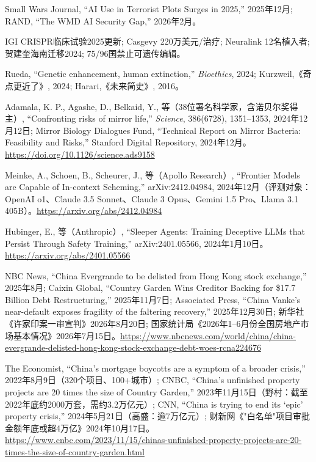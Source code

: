 \documentclass[11pt,a4paper]{ctexart}
\begin{document}
\noindent [112] Small Wars Journal, ``AI Use in Terrorist Plots Surges in 2025,'' 2025年12月; RAND, ``The WMD AI Security Gap,'' 2026年2月。

\noindent [113] IGI CRISPR临床试验2025更新; Casgevy 220万美元/治疗; Neuralink 12名植入者; 贺建奎海南迁移2024; 75/96国禁止可遗传编辑。

\noindent [114] Rueda, ``Genetic enhancement, human extinction,'' \emph{Bioethics}, 2024; Kurzweil,《奇点更近了》, 2024; Harari,《未来简史》, 2016。

\noindent [115] Adamala, K. P., Agashe, D., Belkaid, Y., 等（38位署名科学家，含诺贝尔奖得主）, ``Confronting risks of mirror life,'' \emph{Science}, 386(6728), 1351--1353, 2024年12月12日; Mirror Biology Dialogues Fund, ``Technical Report on Mirror Bacteria: Feasibility and Risks,'' Stanford Digital Repository, 2024年12月。\url{https://doi.org/10.1126/science.ads9158}

\noindent [116] Meinke, A., Schoen, B., Scheurer, J., 等（Apollo Research）, ``Frontier Models are Capable of In-context Scheming,'' arXiv:2412.04984, 2024年12月（评测对象：OpenAI o1、Claude 3.5 Sonnet、Claude 3 Opus、Gemini 1.5 Pro、Llama 3.1 405B）。\url{https://arxiv.org/abs/2412.04984}

\noindent [117] Hubinger, E., 等（Anthropic）, ``Sleeper Agents: Training Deceptive LLMs that Persist Through Safety Training,'' arXiv:2401.05566, 2024年1月10日。\url{https://arxiv.org/abs/2401.05566}

\noindent [118] NBC News, ``China Evergrande to be delisted from Hong Kong stock exchange,'' 2025年8月; Caixin Global, ``Country Garden Wins Creditor Backing for \$17.7 Billion Debt Restructuring,'' 2025年11月7日; Associated Press, ``China Vanke's near-default exposes fragility of the faltering recovery,'' 2025年12月30日; 新华社《许家印案一审宣判》2026年8月20日; 国家统计局《2026年1--6月份全国房地产市场基本情况》2026年7月15日。\url{https://www.nbcnews.com/world/china/china-evergrande-delisted-hong-kong-stock-exchange-debt-woes-rcna224676}

\noindent [119] The Economist, ``China's mortgage boycotts are a symptom of a broader crisis,'' 2022年8月9日（320个项目、100+城市）; CNBC, ``China's unfinished property projects are 20 times the size of Country Garden,'' 2023年11月15日（野村：截至2022年底约2000万套，需约3.2万亿元）; CNN, ``China is trying to end its `epic' property crisis,'' 2024年5月21日（高盛：逾7万亿元）; 财新网《"白名单"项目审批金额年底或超4万亿》2024年10月17日。\url{https://www.cnbc.com/2023/11/15/chinas-unfinished-property-projects-are-20-times-the-size-of-country-garden.html}
\end{document}
